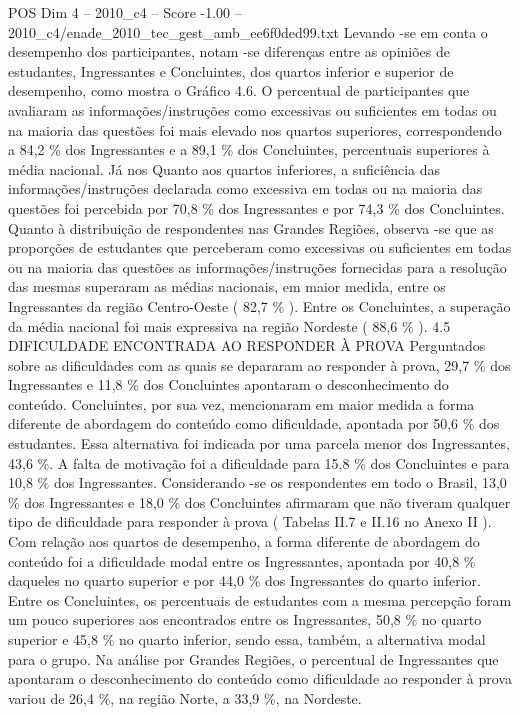\begin{textsample}{POS Dim 4 – 2010\_c4 – Score -1.00 – 2010\_c4/enade\_2010\_tec\_gest\_amb\_ee6f0ded99.txt}
Levando -se em conta o desempenho dos participantes, notam -se diferenças entre as opiniões de estudantes, Ingressantes e Concluintes, dos quartos inferior e superior de desempenho, como mostra o Gráfico 4.6.
O percentual de participantes que avaliaram as informações/instruções como excessivas ou suficientes em todas ou na maioria das questões foi mais elevado nos quartos superiores, correspondendo a 84,2 \% dos Ingressantes e a 89,1 \% dos Concluintes, percentuais superiores à média nacional.
Já nos Quanto aos quartos inferiores, a suficiência das informações/instruções declarada como excessiva em todas ou na maioria das questões foi percebida por 70,8 \% dos Ingressantes e por 74,3 \% dos Concluintes.
Quanto à distribuição de respondentes nas Grandes Regiões, observa -se que as proporções de estudantes que perceberam como excessivas ou suficientes em todas ou na maioria das questões as informações/instruções fornecidas para a resolução das mesmas superaram as médias nacionais, em maior medida, entre os Ingressantes da região Centro-Oeste ( 82,7 \% ).
Entre os Concluintes, a superação da média nacional foi mais expressiva na região Nordeste ( 88,6 \% ). 4.5 DIFICULDADE ENCONTRADA AO RESPONDER À PROVA Perguntados sobre as dificuldades com as quais se depararam ao responder à prova, 29,7 \% dos Ingressantes e 11,8 \% dos Concluintes apontaram o desconhecimento do conteúdo.
Concluintes, por sua vez, mencionaram em maior medida a forma diferente de abordagem do conteúdo como dificuldade, apontada por 50,6 \% dos estudantes.
Essa alternativa foi indicada por uma parcela menor dos Ingressantes, 43,6 \%.
A falta de motivação foi a dificuldade para 15,8 \% dos Concluintes e para 10,8 \% dos Ingressantes.
Considerando -se os respondentes em todo o Brasil, 13,0 \% dos Ingressantes e 18,0 \% dos Concluintes afirmaram que não tiveram qualquer tipo de dificuldade para responder à prova ( Tabelas II.7 e II.16 no Anexo II ).
Com relação aos quartos de desempenho, a forma diferente de abordagem do conteúdo foi a dificuldade modal entre os Ingressantes, apontada por 40,8 \% daqueles no quarto superior e por 44,0 \% dos Ingressantes do quarto inferior.
Entre os Concluintes, os percentuais de estudantes com a mesma percepção foram um pouco superiores aos encontrados entre os Ingressantes, 50,8 \% no quarto superior e 45,8 \% no quarto inferior, sendo essa, também, a alternativa modal para o grupo.
Na análise por Grandes Regiões, o percentual de Ingressantes que apontaram o desconhecimento do conteúdo como dificuldade ao responder à prova variou de 26,4 \%, na região Norte, a 33,9 \%, na Nordeste.

\end{textsample}

